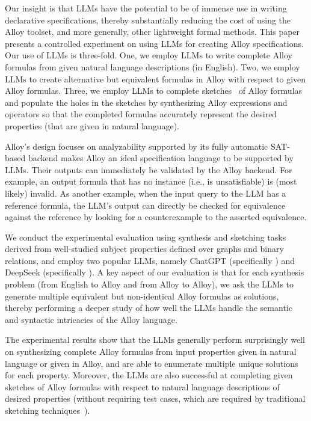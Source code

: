 Our insight is that LLMs have the potential to be of immense use in
writing declarative specifications, thereby substantially reducing the
cost of using the Alloy toolset, and more generally, other lightweight
formal methods.  This paper presents a controlled experiment on using
LLMs for creating Alloy specifications.  Our use of LLMs is
three-fold.  One, we employ LLMs to write complete Alloy formulas from
given natural language descriptions (in English).  Two, we employ LLMs
to create alternative but equivalent formulas in Alloy with respect to
given Alloy formulas.  Three, we employ LLMs to complete
sketches~\cite{SolarLazemaPhD2008,WangETALABZ2018ASketch} of Alloy
formulas and populate the holes in the sketches by synthesizing Alloy
expressions and operators so that the completed formulas accurately
represent the desired properties (that are given in natural language).

Alloy's design focuses on analyzability supported by its fully automatic
SAT-based backend makes Alloy an ideal specification language to be
supported by LLMs.  Their outputs can immediately be validated by the
Alloy backend.  For example, an output formula that has no instance
(i.e., is unsatisfiable) is (most likely) invalid.  As another
example, when the input query to the LLM has a reference formula, the
LLM's output can directly be checked for equivalence against the
reference by looking for a counterexample to the asserted equivalence.

We conduct the experimental evaluation using synthesis and sketching
tasks derived from \NumSubjects{} well-studied subject properties
defined over graphs and binary relations, and employ two popular LLMs,
namely ChatGPT (specifically \ChatGPTUsed) and DeepSeek (specifically
\DeepSeekUsed).  A key aspect of our evaluation is that for each
synthesis problem (from English to Alloy and from Alloy to Alloy), we
ask the LLMs to generate multiple equivalent but non-identical Alloy
formulas as solutions, thereby performing a deeper study of how well
the LLMs handle the semantic and syntactic intricacies of the Alloy
language.

The experimental results show that the LLMs generally perform
surprisingly well on synthesizing complete Alloy formulas from input
properties given in natural language or given in Alloy, and are able
to enumerate multiple unique solutions for each property.  Moreover,
the LLMs are also successful at completing given sketches of Alloy
formulas with respect to natural language descriptions of desired
properties (without requiring test cases, which are required by
traditional sketching
techniques~\cite{SolarLazemaPhD2008,WangETALABZ2018ASketch}).

